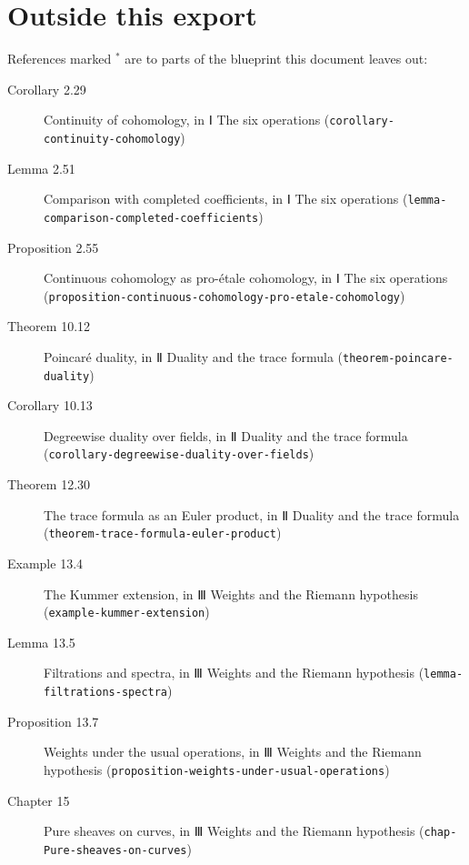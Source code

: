 \documentclass[11pt]{article}
\newcommand{\bpslug}[1]{\texttt{#1}}
\begin{document}
\clearpage{}\hypertarget{bp-outside}{}%
\section*{Outside this export}
References marked \ensuremath{{}^\ast} are to parts of the blueprint this document leaves out:
\begin{description}
\item[Corollary 2.29] Continuity of cohomology, in Ⅰ The six operations (\bpslug{corollary-{}\allowbreak{}continuity-{}\allowbreak{}cohomology})
\item[Lemma 2.51] Comparison with completed coefficients, in Ⅰ The six operations (\bpslug{lemma-{}\allowbreak{}comparison-{}\allowbreak{}completed-{}\allowbreak{}coefficients})
\item[Proposition 2.55] Continuous cohomology as pro-étale cohomology, in Ⅰ The six operations (\bpslug{proposition-{}\allowbreak{}continuous-{}\allowbreak{}cohomology-{}\allowbreak{}pro-{}\allowbreak{}etale-{}\allowbreak{}cohomology})
\item[Theorem 10.12] Poincaré duality, in Ⅱ Duality and the trace formula (\bpslug{theorem-{}\allowbreak{}poincare-{}\allowbreak{}duality})
\item[Corollary 10.13] Degreewise duality over fields, in Ⅱ Duality and the trace formula (\bpslug{corollary-{}\allowbreak{}degreewise-{}\allowbreak{}duality-{}\allowbreak{}over-{}\allowbreak{}fields})
\item[Theorem 12.30] The trace formula as an Euler product, in Ⅱ Duality and the trace formula (\bpslug{theorem-{}\allowbreak{}trace-{}\allowbreak{}formula-{}\allowbreak{}euler-{}\allowbreak{}product})
\item[Example 13.4] The Kummer extension, in Ⅲ Weights and the Riemann hypothesis (\bpslug{example-{}\allowbreak{}kummer-{}\allowbreak{}extension})
\item[Lemma 13.5] Filtrations and spectra, in Ⅲ Weights and the Riemann hypothesis (\bpslug{lemma-{}\allowbreak{}filtrations-{}\allowbreak{}spectra})
\item[Proposition 13.7] Weights under the usual operations, in Ⅲ Weights and the Riemann hypothesis (\bpslug{proposition-{}\allowbreak{}weights-{}\allowbreak{}under-{}\allowbreak{}usual-{}\allowbreak{}operations})
\item[Chapter 15] Pure sheaves on curves, in Ⅲ Weights and the Riemann hypothesis (\bpslug{chap-{}\allowbreak{}Pure-{}\allowbreak{}sheaves-{}\allowbreak{}on-{}\allowbreak{}curves})

\end{description}
\end{document}
